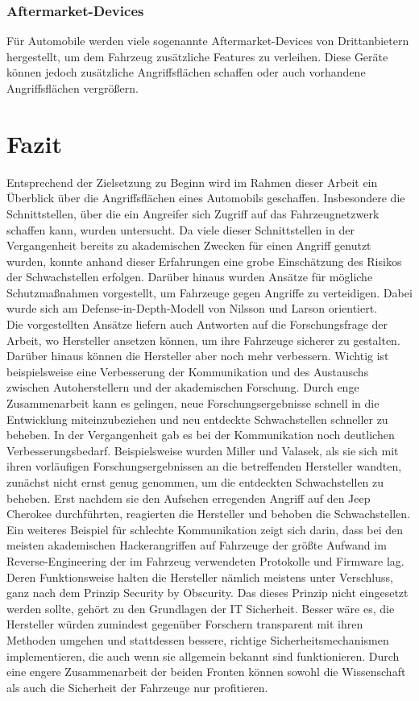 \subsection{Aftermarket-Devices}
Für Automobile werden viele sogenannte Aftermarket-Devices von Drittanbietern hergestellt, um dem Fahrzeug zusätzliche Features zu verleihen. Diese Geräte können jedoch zusätzliche Angriffsflächen schaffen oder auch vorhandene Angriffsflächen vergrößern. \cite[233]{Wurm.2022}




\chapter{Fazit}
Entsprechend der Zielsetzung zu Beginn wird im Rahmen dieser Arbeit ein Überblick über die Angriffsflächen eines Automobils geschaffen. Insbesondere die Schnittstellen, über die ein Angreifer sich Zugriff auf das Fahrzeugnetzwerk schaffen kann, wurden untersucht. Da viele dieser Schnittstellen in der Vergangenheit bereits zu akademischen Zwecken für einen Angriff genutzt wurden, konnte anhand dieser Erfahrungen eine grobe Einschätzung des Risikos der Schwachstellen erfolgen. Darüber hinaus wurden Ansätze für mögliche Schutzmaßnahmen vorgestellt, um Fahrzeuge gegen Angriffe zu verteidigen. Dabei wurde sich am Defense-in-Depth-Modell von Nilsson und Larson orientiert.\\
Die vorgestellten Ansätze liefern auch Antworten auf die Forschungsfrage der Arbeit, wo Hersteller ansetzen können, um ihre Fahrzeuge sicherer zu gestalten. Darüber hinaus können die Hersteller aber noch mehr verbessern. Wichtig ist beispielsweise eine Verbesserung der Kommunikation und des Austauschs zwischen Autoherstellern und der akademischen Forschung. Durch enge Zusammenarbeit kann es gelingen, neue Forschungsergebnisse schnell in die Entwicklung miteinzubeziehen und neu entdeckte Schwachstellen schneller zu beheben. In der Vergangenheit gab es bei der Kommunikation noch deutlichen Verbesserungsbedarf. Beispielsweise wurden Miller und Valasek, als sie sich mit ihren vorläufigen Forschungsergebnissen an die betreffenden Hersteller wandten, zunächst nicht ernst genug genommen, um die entdeckten Schwachstellen zu beheben. Erst nachdem sie den Aufsehen erregenden Angriff auf den Jeep Cherokee durchführten, reagierten die Hersteller und behoben die Schwachstellen.\\
Ein weiteres Beispiel für schlechte Kommunikation zeigt sich darin, dass bei den meisten akademischen Hackerangriffen auf Fahrzeuge der größte Aufwand im Reverse-Engineering der im Fahrzeug verwendeten Protokolle und Firmware lag. Deren Funktionsweise halten die Hersteller nämlich meistens unter Verschluss, ganz nach dem Prinzip \glqq Security by Obscurity\grqq . Das dieses Prinzip nicht eingesetzt werden sollte, gehört zu den Grundlagen der IT Sicherheit. Besser wäre es, die Hersteller würden zumindest gegenüber Forschern transparent mit ihren Methoden umgehen und stattdessen bessere, richtige Sicherheitsmechanismen implementieren, die auch wenn sie allgemein bekannt sind funktionieren. Durch eine engere Zusammenarbeit der beiden Fronten können sowohl die Wissenschaft als auch die Sicherheit der Fahrzeuge nur profitieren.\\
